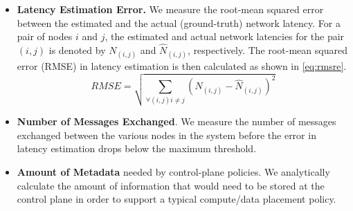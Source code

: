 \begin{itemize}
\item \textbf{Latency Estimation Error.} We measure the root-mean squared error between the estimated and the actual (ground-truth) network latency. For a pair of nodes $i$ and $j$, the estimated and actual network latencies for the pair $\left( i, j\right)$ is denoted by $N_{\left( i, j\right)}$ and $\hat{N}_{\left( i, j\right)}$, respectively. The root-mean squared error (RMSE) in latency estimation is then calculated as shown in \cref{eq:rmsre}.
\begin{equation}
\label{eq:rmsre}
RMSE = \sqrt{\sum_{\forall \left(i, j \right) i \neq j}{\left(N_{\left( i, j\right)} - \hat{N}_{\left( i, j\right)}\right)^2}}
\end{equation}
\item \textbf{Number of Messages Exchanged}. We measure the number of messages exchanged between the various nodes in the system before the error in latency estimation drops below the maximum threshold.
\item \textbf{Amount of Metadata} needed by control-plane policies. We analytically calculate the amount of information that would need to be stored at the control plane in order to support a typical compute/data placement policy.
\end{itemize}

